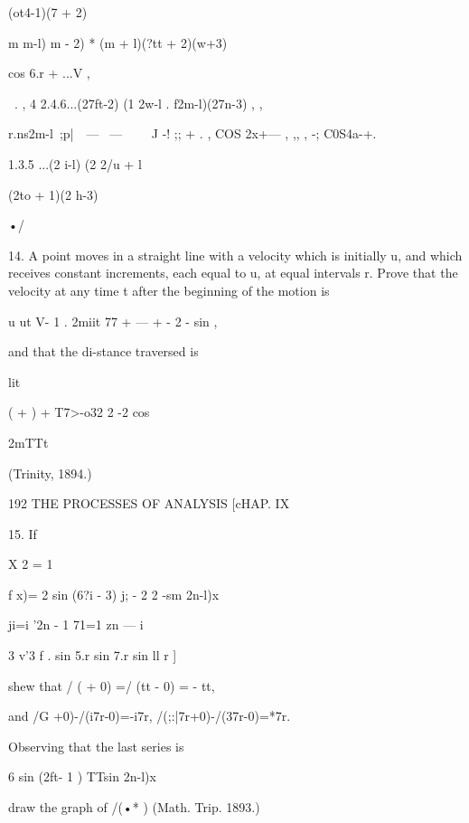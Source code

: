 {(ot4-1)(7  + 2) 

m m-l) m - 2) 
 *  (m + l)(?tt + 2)(w+3) 



cos 6.r + ...V , 



  \ . , 4 2.4.6...(27ft-2) (1 2w-l . f2m-l)(27n-3) , , 

r.ns2m-l\ ;p|\ \    — \   — \  \ \  \  J  -! ;; +   . , COS 2x+— , ,, ,  -; C0S4a-+. 



1.3.5 ...(2 i-l) (2 2/u + l 



(2to + 1)(2 h-3) 



•/ 



14. A point moves in a straight line with a velocity which is initially u, and which 
receives constant increments, each equal to u, at equal intervals r. Prove that the velocity 
at any time t after the beginning of the motion is 



u ut V-   1 . 2miit 
77 + — + - 2 - sin , 



and that the di-stance traversed is 



lit 



(  +  ) + T7>-o32 2 -2 cos 



2mTTt 



(Trinity, 1894.) 



192 THE PROCESSES OF ANALYSIS [cHAP. IX 

15. If 

X 2  = 1 

f x)= 2 sin (6?i - 3) j; - 2 2 -sm 2n-l)x 

ji=i '2n - 1 71=1 zn — i 

3 v'3 f . sin 5.r sin 7.r sin ll r ] 

shew that / ( + 0) =/ (tt - 0) = -  tt, 

and /G +0)-/(i7r-0)=-i7r, /(;:|7r+0)-/(37r-0)=*7r. 

Observing that the last series is 

6   sin   (2ft- 1 ) TTsin  2n-l)x 

draw the graph of /(•* )  (Math. Trip. 1893.) 

}
